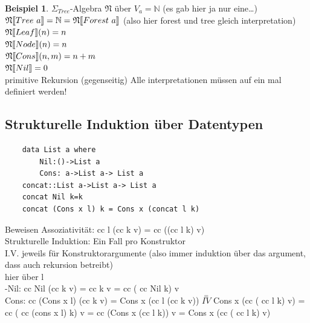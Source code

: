 \documentclass{article}
\theoremstyle{definition}
\newtheorem{beispiel}{Beispiel}[section]
\begin{document}
	\begin{beispiel} $\Sigma_{Tree}$-Algebra $\mathfrak{N}$ über $V_a = \mathbb{N}$ (es gab hier ja nur eine\dots)
	$\mathfrak{N}\dbrack{Tree\ a}=\mathbb{N}=\mathfrak{N}\dbrack{Forest\ a}$ (also hier forest und tree gleich interpretation)
	$\mathfrak{N}\llbracket Leaf\rrbracket(n)=n$\\
	$\mathfrak{N}\llbracket Node\rrbracket(n)=n$\\
	$\mathfrak{N}\llbracket Cons\rrbracket(n,m)=n+m$\\
	$\mathfrak{N}\llbracket Nil\rrbracket=0$\\
	primitive Rekursion (gegenseitig) \danger Alle interpretationen müssen auf ein mal definiert werden!\\
	\subsection{Strukturelle Induktion über Datentypen}
	\begin{verbatim}
	data List a where
		Nil:()->List a
		Cons: a->List a-> List a
	concat::List a->List a-> List a
	concat Nil k=k
	concat (Cons x l) k = Cons x (concat l k)
	\end{verbatim}
	Beweisen Assoziativität:
	cc l (cc k v) = cc ((cc l k) v)\\
	Strukturelle Induktion: Ein Fall pro Konstruktor \\
	I.V. jeweils für Konstruktorargumente (also immer induktion über das argument, dass auch rekursion betreibt)\\
	hier über l\\
	-Nil: cc Nil (cc k v) = cc k v = cc ( cc Nil k) v\\
	Cons: cc (Cons x l) (cc k v) = Cons x (cc l (cc k v)) $\stackrel{=}{IV}$ Cons x (cc ( cc l k) v) = cc ( cc (cons x l) k) v = cc (Cons x (cc l k)) v = Cons x (cc ( cc l k) v)
	\end{beispiel}
\end{document}
